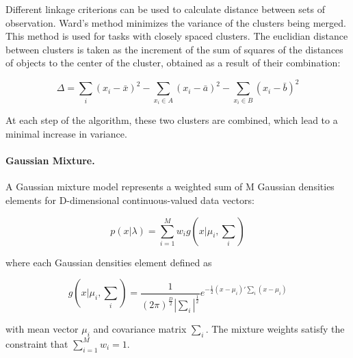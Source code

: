 \documentclass[11pt]{article}
\begin{document}
Different linkage criterions can be used to calculate distance between sets of observation. Ward’s method minimizes the variance of the clusters being merged. This method is used for tasks with closely spaced clusters. The euclidian distance between clusters is taken as the increment of the sum of squares of the distances of objects to the center of the cluster, obtained as a result of their combination: 

\begin{equation}
\Delta = \sum_{i} {(x_{i} - {\bar {x}})^{2}} - \sum_{x_{i} \in A} (x_{i} - {\bar {a}})^{2} - \sum_{x_{i} \in B} (x_{i} - {\bar {b}})^{2}
\end{equation}

At each step of the algorithm, these two clusters are combined, which lead to a minimal increase in variance.



\paragraph{Gaussian Mixture.}


A Gaussian mixture model \cite{reynolds2015gaussian} represents a weighted sum of M Gaussian densities elements for D-dimensional continuous-valued data vectors:

\begin{equation}
p(x|\lambda) = \sum_{i=1}^{M} w_{i} g(x|\mu_{i}, \sum_{i})
\end{equation}

where each Gaussian densities element defined as 

\begin{equation}
g(x|\mu_{i}, \sum_{i})=\frac{1}{(2\pi)^{\frac{D}{2}}|\sum_{i}|^{\frac{1}{2}}} e^{-\frac{1}{2}(x-\mu_{i})'\sum_{i}(x-\mu_{i})} 
\end{equation}

with mean vector $\mu_{i}$ and covariance matrix $\sum_{i}$. The mixture weights satisfy the constraint that $\sum_{i=1}^{M} w_{i} = 1$.
\end{document}
